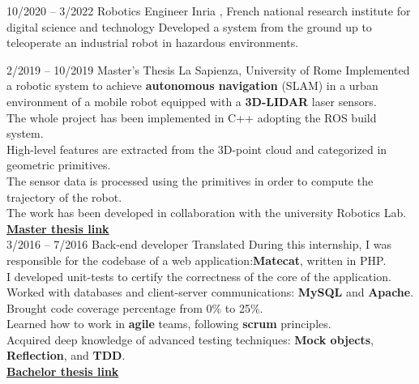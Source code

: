 \documentclass[9pt]{developercv} %
\begin{document}
\vspace{0.5cm}


\begin{entrylist}
        \entry
		{10/2020 -- 3/2022}
		{Robotics Engineer}
		{Inria , French national research institute for digital science and technology}
		{
                  Developed a system from the ground up to teleoperate an industrial robot in hazardous environments.
                }

        \entry
		{2/2019 -- 10/2019}
		{Master's Thesis}
		{La Sapienza, University of Rome}
		{
                Implemented a robotic system to achieve \textbf{autonomous navigation} (SLAM) in a urban environment of a mobile robot equipped with a \textbf{3D-LIDAR} laser sensors.\\
                The whole project has been implemented in C++ adopting the ROS build system.\\
                High-level features are extracted from the 3D-point cloud and categorized in geometric primitives.\\
                The sensor data is processed using the primitives in order to compute the trajectory of the robot.\\
                The work has been developed in collaboration with the university Robotics Lab.\\
                \href{https://github.com/dinies/MasterThesis-ArtificialIntelligence-Robotics/blob/master/MaterThesis_Edoardo_Ghini.pdf}{\textbf{Master thesis link}}\\
                }
	\entry
		{3/2016 -- 7/2016}
		{Back-end developer}
		{Translated}
                {
                  During this internship, I was responsible for the codebase of a web application:\textbf{Matecat}, written in PHP.\\
                  I developed unit-tests to certify the correctness of the core of the application.\\
                  Worked with databases and client-server communications: \textbf{MySQL} and \textbf{Apache}.\\
                  Brought code coverage percentage from 0\% to 25\%.\\
                  Learned how to work in \textbf{agile} teams, following \textbf{scrum} principles.\\
                  Acquired deep knowledge of advanced testing techniques: \textbf{Mock objects}, \textbf{Reflection}, and \textbf{TDD}.\\
                  \href{https://github.com/dinies/BachelorThesis/blob/master/EdoardoGhiniThesis.pdf}{\textbf{Bachelor thesis link}}\\
                }

\end{entrylist}
\end{document}
